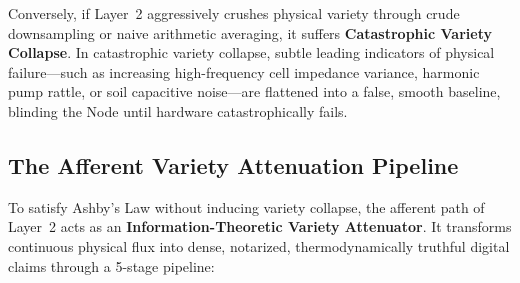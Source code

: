 Conversely, if Layer~2 aggressively crushes physical variety through crude downsampling or naive arithmetic averaging, it suffers \textbf{Catastrophic Variety Collapse}. In catastrophic variety collapse, subtle leading indicators of physical failure---such as increasing high-frequency cell impedance variance, harmonic pump rattle, or soil capacitive noise---are flattened into a false, smooth baseline, blinding the Node until hardware catastrophically fails.

\subsection{The Afferent Variety Attenuation Pipeline}

To satisfy Ashby's Law without inducing variety collapse, the afferent path of Layer~2 acts as an \textbf{Information-Theoretic Variety Attenuator}. It transforms continuous physical flux into dense, notarized, thermodynamically truthful digital claims through a 5-stage pipeline:

